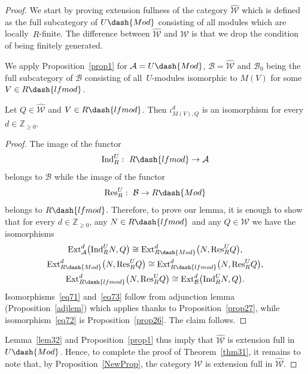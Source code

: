 \documentclass[pdftex]{sigma}
\begin{document}
\begin{proof}
We start by proving extension fullness of the category $\widehat{\mathscr{W}}$ which is def\/ined as the full subcategory
of $U\dash{Mod}$ consisting of all modules which are locally~$R$-f\/inite.
The dif\/ference between $\widehat{\mathscr{W}}$ and $\mathscr{W}$ is that we drop the condition of being f\/initely
generated.

We apply Proposition~\ref{prop1} for $\mathcal{A}=U\dash{Mod}$, $\mathcal{B}=\widehat{\mathscr{W}}$ and $\mathcal{B}_0$
being the full subcategory of $\mathcal{B}$ consisting of all~$U$-modules isomorphic to $M(V)$ for some $V\in
R\dash{lfmod}$.

\begin{lemma}
\label{lem32}
Let $Q\in\widehat{\mathscr{W}}$ and $V\in R\dash{lfmod}$.
Then $\iota^d_{M(V),Q}$ is an isomorphism for every $d\in\mathbb{Z}_{\geq 0}$.
\end{lemma}

\begin{proof}
The image of the functor
\begin{gather*}
\mathrm{Ind}_{R}^{U}: \ R\dash{lfmod}\to \mathcal{A}
\end{gather*}
belongs to $\mathcal{B}$ while the image of the functor
\begin{gather*}
\mathrm{Res}_{R}^{U}: \ \mathcal{B}\to R\dash{Mod}
\end{gather*}
belongs to $R\dash{lfmod}$.
Therefore, to prove our lemma, it is enough to show that for every $d\in\mathbb{Z}_{\geq 0}$, any $N\in R\dash{lfmod}$
and any $Q\in\mathscr{W}$ we have the isomorphisms
\begin{gather}
\label{eq71}
\mathrm{Ext}^d_{\mathcal{A}}\big(\mathrm{Ind}_{R}^U N, Q\big)  \cong  \mathrm{Ext}^d_{R\dash{Mod}}\big(N,\mathrm{Res}_{R}^U Q\big),
\\
\label{eq72}
\mathrm{Ext}^d_{R\dash{Mod}}\big(N,\mathrm{Res}_{R}^U Q\big)  \cong  \mathrm{Ext}^d_{R\dash{lfmod}}\big(N,\mathrm{Res}_{R}^U Q\big),
\\
\label{eq73}
\mathrm{Ext}^d_{R\dash{lfmod}}\big(N,\mathrm{Res}_{R}^U Q\big)  \cong  \mathrm{Ext}^d_{\mathcal{B}}\big(\mathrm{Ind}_{R}^U N, Q\big).
\end{gather}
Isomorphisms~\eqref{eq71} and~\eqref{eq73} follow from adjunction lemma (Proposition~\ref{adjlem}) which applies thanks
to Proposition~\ref{prop27}, while isomorphism~\eqref{eq72} is Proposition~\ref{prop26}.
The claim follows.
\end{proof}

Lemma~\ref{lem32} and Proposition~\ref{prop1} thus imply that $\widehat{\mathscr{W}}$ is extension full in
$U\dash{Mod}$.
Hence, to complete the proof of Theorem~\ref{thm31}, it remains to note that, by Proposition~\ref{NewProp}, the category
$\mathscr{W}$ is extension full in $\widehat{\mathscr{W}}$.
\end{proof}
\end{document}
